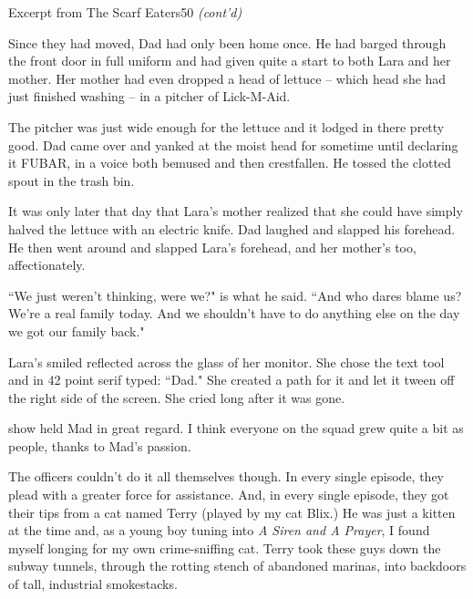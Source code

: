 \documentclass[12pt,twoside]{report}
\begin{document}
\pagebreak


	\begin{sidebar}{Excerpt from The Scarf Eaters}{50}
		\textit{(cont'd)} \vspace{6pt}

		Since they had moved, Dad had only been home once. He had barged through the front door in full uniform and had given quite a start to both Lara and her mother. Her mother had even dropped a head of lettuce -- which head she had just finished washing -- in a pitcher of Lick-M-Aid.\vspace{6pt}
		
		The pitcher was just wide enough for the lettuce and it lodged in there pretty good. Dad came over and yanked at the moist head for sometime until declaring it FUBAR, in a voice both bemused and then crestfallen. He tossed the clotted spout in the trash bin.\vspace{6pt}
		
		It was only later that day that Lara's mother realized that she could have simply halved the lettuce with an electric knife. Dad laughed and slapped his forehead. He then went around and slapped Lara's forehead, and her mother's too, affectionately.
		
		``We just weren't thinking, were we?" is what he said. ``And who dares blame us? We're a real family today. And we shouldn't have to do anything else on the day we got our family back."\vspace{6pt}

		Lara's smiled reflected across the glass of her monitor. She chose the text tool and in 42 point serif typed: ``Dad." She created a path for it and let it tween off the right side of the screen. She cried long after it was gone.\vspace{6pt}
	\end{sidebar}

show held Mad in great regard.
I think everyone on the squad grew quite a bit as people, thanks to
Mad's passion.


The officers couldn't do it all themselves though.  In every single
episode, they plead with a greater force for assistance.  And, in
every single episode, they got their tips from a cat named Terry
(played by my cat Blix.)  He was just a kitten at the time and, as a
young boy tuning into {\em A Siren and A Prayer}, I found myself
longing for my own crime-sniffing cat. Terry took these guys down the
subway tunnels, through the rotting stench of abandoned marinas, into
backdoors of tall, industrial smokestacks.
\end{document}
